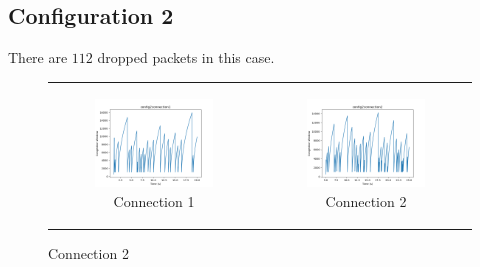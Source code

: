 \documentclass[11pt]{article}
\begin{document}
\subsection{Configuration 2}
There are $112$ dropped packets in this case.
\begin{figure}[H]
  \centering
  \begin{tabular}[c]{cc}
    \begin{subfigure}[c]{0.5\textwidth}
      \centering
      \includegraphics[width=\textwidth]{Q3/outputs/config2connection1.png}
      \caption{Connection 1}
    \end{subfigure}&

    \begin{subfigure}[c]{0.5\textwidth}
      \centering
      \includegraphics[width=\textwidth]{Q3/outputs/config2connection2.png}
      \caption{Connection 2}
    \end{subfigure}\\


\end{tabular}
\end{figure}
\end{document}
